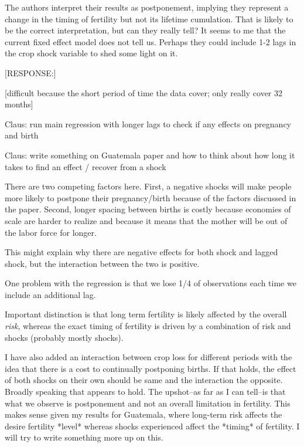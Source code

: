 \documentclass[letterpaper,12pt]{article}
\begin{document}
\begin{description}

\item The authors interpret their results as postponement, implying they
represent a change in the timing of fertility but not its lifetime
cumulation. That is likely to be the correct interpretation, but can
they really tell? It seems to me that the current fixed effect model
does not tell us. Perhaps they could include 1-2 lags in the crop shock
variable to shed some light on it.

[RESPONSE:]

[difficult because the short period of time the data cover; only
really cover 32 months]

Claus: run main regression with longer lags to check if any effects
on pregnancy and birth 

Claus: write something on Guatemala paper and how to think about how
long it takes to find an effect / recover from a shock


There are two competing factors here.
First, a negative shocks will make people more likely to postpone 
their pregnancy/birth because of the factors discussed in the
paper.
Second, longer spacing between births is costly because economies
of scale are harder to realize and because it means that the mother
will be out of the labor force for longer.

This might explain why there are negative effects for both shock
and lagged shock, but the interaction between the two is positive.

One problem with the regression is that we lose 1/4 of observations
each time we include an additional lag.


Important distinction is that long term fertility is likely
affected by the overall \emph{risk}, whereas the exact timing of
fertility is driven by a combination of risk and shocks (probably
mostly shocks).


I have also added an interaction between crop loss for different periods
with the idea that there is a cost to continually postponing births. If
that holds, the effect of both shocks on their own should be same and
the interaction the opposite. Broadly speaking that appears to hold. The
upshot–as far as I can tell–is that what we observe is postponement and
not an overall limitation in fertility. This makes sense given my
results for Guatemala, where long-term risk affects the desire fertility
*level* whereas shocks experienced affect the *timing* of fertility. I
will try to write something more up on this.


\end{description}
\end{document}
